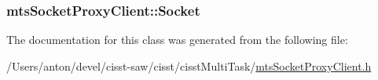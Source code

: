 \subsubsection[{Socket}]{ mts\+Socket\+Proxy\+Client\+::\+Socket\hspace{0.3cm}{\ttfamily [protected]}}\label{classmts_socket_proxy_client_a324fcc343989f521b7ccd1aa1fec63e9}


The documentation for this class was generated from the following file\+:\begin{DoxyCompactItemize}
\item 
/\+Users/anton/devel/cisst-\/saw/cisst/cisst\+Multi\+Task/\hyperlink{mts_socket_proxy_client_8h}{mts\+Socket\+Proxy\+Client.\+h}\end{DoxyCompactItemize}
